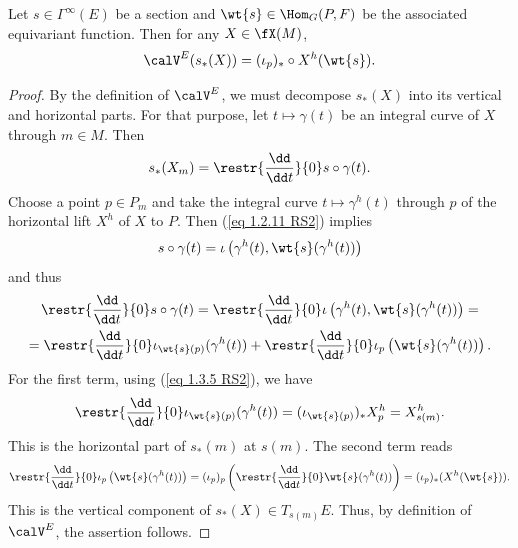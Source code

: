 \begin{prop}[{{\cite[Prop.~1.5.6]{RS2}}}]\label{prop 1.5.6 RS2 my version}
    Let $s\in\Gamma^\infty(E)$ be a section and $\wt{s}\in\Hom_G(P,F)$ be the associated equivariant function. Then for any $X\in\fX(M)$,
    \[\calV^E(s_\ast(X))=(\iota_p)_\ast\circ X^h(\wt{s}).\]
\end{prop}
\begin{proof}
    By the definition of $\calV^E$, we must decompose $s_\ast(X)$ into its vertical and horizontal parts. For that purpose, let $t\mapsto \gamma(t)$ be an integral curve of $X$ through $m\in M$. Then
    \[s_\ast( X_m)=\restr{\frac{\dd}{\dd t}}{0}s\circ \gamma(t).\]
    Choose a point $p\in P_m$ and take the integral curve $t\mapsto \gamma^h(t)$ through $p$ of the horizontal lift $X^h$ of $X$ to $P$. Then (\ref{eq 1.2.11 RS2}) implies
    \[s\circ\gamma(t)=\iota\left(\gamma^h(t),\wt{s}(\gamma^h(t))\right)\]
    and thus
    \begin{multline}
        \restr{\frac{\dd}{\dd t}}{0} s\circ\gamma(t)=\restr{\frac{\dd}{\dd t}}{0} \iota\left(\gamma^h(t),\wt{s}(\gamma^h(t))\right)=\\
        =\restr{\frac{\dd}{\dd t}}{0} \iota_{\wt{s}(p)}(\gamma^h(t))+\restr{\frac{\dd}{\dd t}}{0}\iota_p\left(\wt{s}(\gamma^h(t))\right).
    \end{multline}
    For the first term, using (\ref{eq 1.3.5 RS2}), we have
    \[\restr{\frac{\dd}{\dd t}}{0}\iota_{\wt{s}(p)}(\gamma^h(t))=(\iota_{\wt{s}(p)})_\ast X_p^h=X^h_{s(m)}.\]
    This is the horizontal part of $s_\ast(m)$ at $s(m)$. The second term reads
    \[\restr{\frac{\dd}{\dd t}}{0}\iota_p\left(\wt{s}(\gamma^h(t))\right)= (\iota_p)_p\left(\restr{\frac{\dd}{\dd t}}{0} \wt{s}(\gamma^h(t))\right)=(\iota_p)_\ast(X^h (\wt{s})).\]
    This is the vertical component of $s_\ast(X)\in T_{s(m)}E$. Thus, by definition of $\calV^E$, the assertion follows.
\end{proof}

